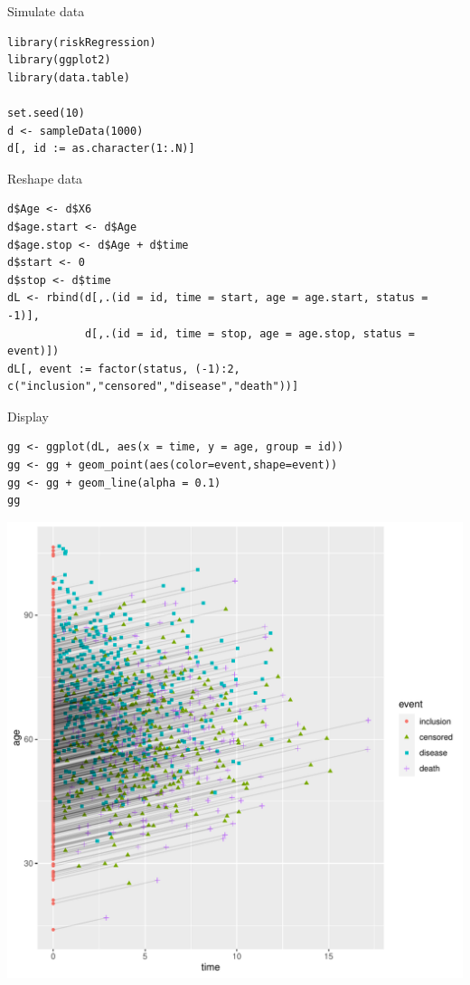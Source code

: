 \documentclass{article}
\begin{document}
Simulate data
\lstset{language=r,label= ,caption= ,captionpos=b,numbers=none}
\begin{lstlisting}
library(riskRegression)
library(ggplot2)
library(data.table)

set.seed(10)
d <- sampleData(1000)
d[, id := as.character(1:.N)]
\end{lstlisting}

Reshape data
\lstset{language=r,label= ,caption= ,captionpos=b,numbers=none}
\begin{lstlisting}
d$Age <- d$X6
d$age.start <- d$Age
d$age.stop <- d$Age + d$time
d$start <- 0
d$stop <- d$time
dL <- rbind(d[,.(id = id, time = start, age = age.start, status = -1)],
            d[,.(id = id, time = stop, age = age.stop, status = event)])
dL[, event := factor(status, (-1):2, c("inclusion","censored","disease","death"))]
\end{lstlisting}
Display
\lstset{language=r,label= ,caption= ,captionpos=b,numbers=none}
\begin{lstlisting}
gg <- ggplot(dL, aes(x = time, y = age, group = id))
gg <- gg + geom_point(aes(color=event,shape=event)) 
gg <- gg + geom_line(alpha = 0.1) 
gg
\end{lstlisting}

\begin{center}
\includegraphics[width=1\textwidth]{./figures/fig-gg-lexis.pdf}
\end{center}
\end{document}
